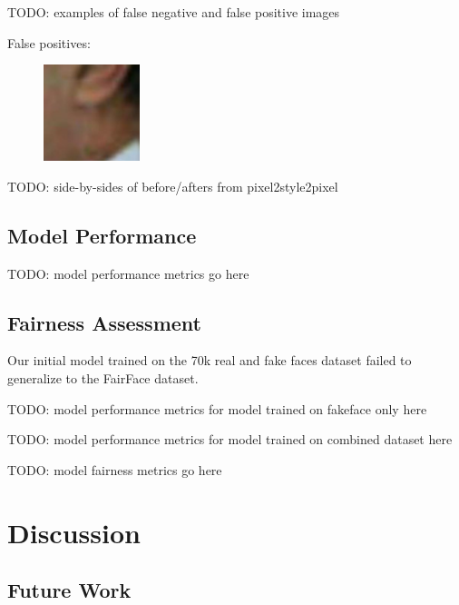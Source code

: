 \documentclass[11pt, letterpaper]{article}
\begin{document}
\begin{multicols}{2}
  TODO: examples of false negative and false positive images

  False positives:

  \begin{figure} %
    \centering
    \includegraphics[width=0.25\textwidth]{figures/crop-failures/dlib/false-positives/fairface/61.jpg}
    \label{falsepos1}
  \end{figure}

  TODO: side-by-sides of before/afters from pixel2style2pixel

  \subsection{Model Performance}

  TODO: model performance metrics go here

  \subsection{Fairness Assessment}

  Our initial model trained on the 70k real and fake faces dataset failed to
  generalize to the FairFace dataset.

  TODO: model performance metrics for model trained on fakeface only here

  TODO: model performance metrics for model trained on combined dataset here

  TODO: model fairness metrics go here

  \section{Discussion}

  \subsection{Future Work}
\end{multicols}



\end{document}
